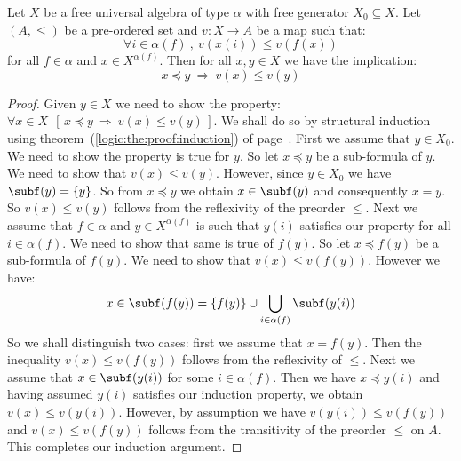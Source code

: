\begin{prop}\label{logic:prop:UA:subformula:non:decreasing}
Let $X$ be a free universal algebra of type $\alpha$ with free
generator $X_{0}\subseteq X$. Let $(A,\leq)$ be a pre-ordered set
and $v:X\to A$ be a map such that:
    \[
    \forall i\in\alpha(f)\ ,\ v(x(i))\leq v(f(x))
    \]
for all $f\in\alpha$ and $x\in X^{\alpha(f)}$. Then for all $x,y\in
X$ we have the implication:
    \[
    x\preceq y\ \Rightarrow\ v(x)\leq v(y)
    \]
\end{prop}
\begin{proof}
Given $y\in X$ we need to show the property: $\forall x\in X\ \
[\,x\preceq y\ \Rightarrow\ v(x)\leq v(y)\,]$. We shall do so by
structural induction using theorem~(\ref{logic:the:proof:induction})
of page~\pageref{logic:the:proof:induction}. First we assume that
$y\in X_{0}$. We need to show the property is true for $y$. So let
$x\preceq y$ be a sub-formula of $y$. We need to show that $v(x)\leq
v(y)$. However, since $y\in X_{0}$ we have $\subf(y)=\{y\}$. So from
$x\preceq y$ we obtain $x\in\subf(y)$ and consequently $x=y$. So
$v(x)\leq v(y)$ follows from the reflexivity of the preorder $\leq$.
Next we assume that $f\in\alpha$ and $y\in X^{\alpha(f)}$ is such
that $y(i)$ satisfies our property for all $i\in\alpha(f)$. We need
to show that same is true of $f(y)$. So let $x\preceq f(y)$ be a
sub-formula of $f(y)$. We need to show that $v(x)\leq v(f(y))$.
However we have:
    \[
    x\in \subf(f(y)) =
    \{f(y)\}\cup\bigcup_{i\in\alpha(f)}\subf(y(i))
    \]
So we shall distinguish two cases: first we assume that $x=f(y)$.
Then the inequality $v(x)\leq v(f(y))$ follows from the reflexivity
of $\leq$. Next we assume that $x\in\subf(y(i))$ for some
$i\in\alpha(f)$. Then we have $x\preceq y(i)$ and having assumed
$y(i)$ satisfies our induction property, we obtain $v(x)\leq
v(y(i))$. However, by assumption we have $v(y(i))\leq v(f(y))$ and
$v(x)\leq v(f(y))$ follows from the transitivity of the preorder
$\leq$ on $A$. This completes our induction argument.
\end{proof}
